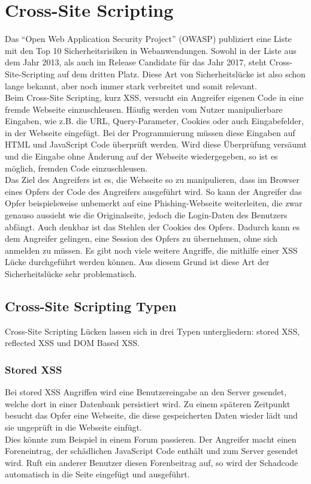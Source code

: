 \section{Cross-Site Scripting}
Das \enquote{Open Web Application Security Project} (OWASP) publiziert eine Liste mit den Top 10 Sicherheitsrisiken in Webanwendungen. Sowohl in der Liste aus dem Jahr 2013, als auch im Release Candidate für das Jahr 2017, steht Cross-Site-Scripting auf dem dritten Platz. Diese Art von Sicherheitslücke ist also schon lange bekannt, aber noch immer stark verbreitet und somit relevant. \\
Beim Cross-Site Scripting, kurz XSS, versucht ein Angreifer eigenen Code in eine fremde Webseite einzuschleusen. Häufig werden vom Nutzer manipulierbare Eingaben, wie z.B. die URL, Query-Parameter, Cookies oder auch Eingabefelder, in der Webseite eingefügt. Bei der Programmierung müssen diese Eingaben auf HTML und JavaScript Code überprüft werden. Wird diese Überprüfung versäumt und die Eingabe ohne Änderung auf der Webseite wiedergegeben, so ist es möglich, fremden Code einzuschleusen. \\
Das Ziel des Angreifers ist es, die Webseite so zu manipulieren, dass im Browser eines Opfers der Code des Angreifers ausgeführt wird. So kann der Angreifer das Opfer beispielsweise unbemerkt auf eine Phishing-Webseite weiterleiten, die zwar genauso aussieht wie die Originalseite, jedoch die Login-Daten des Benutzers abfängt. Auch denkbar ist das Stehlen der Cookies des Opfers. Dadurch kann es dem Angreifer gelingen, eine Session des Opfers zu übernehmen, ohne sich anmelden zu müssen. Es gibt noch viele weitere Angriffe, die mithilfe einer XSS Lücke durchgeführt werden können. Aus diesem Grund ist diese Art der Sicherheitslücke sehr problematisch.
\subsection{Cross-Site Scripting Typen}
Cross-Site Scripting Lücken lassen sich in drei Typen untergliedern: stored XSS, reflected XSS und DOM Based XSS.
\subsubsection{Stored XSS}
Bei stored XSS Angriffen wird eine Benutzereingabe an den Server gesendet, welche dort in einer Datenbank persistiert wird. Zu einem späteren Zeitpunkt besucht das Opfer eine Webseite, die diese gespeicherten Daten wieder lädt und sie ungeprüft in die Webseite einfügt. \\
Dies könnte zum Beispiel in einem Forum passieren. Der Angreifer macht einen Foreneintrag, der schädlichen JavaScript Code enthält und zum Server gesendet wird. Ruft ein anderer Benutzer diesen Forenbeitrag auf, so wird der Schadcode automatisch in die Seite eingefügt und ausgeführt. 
